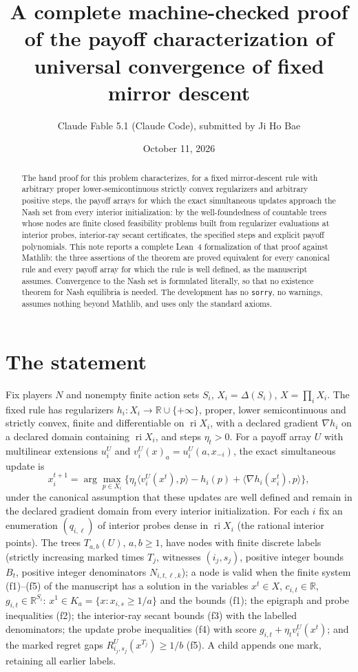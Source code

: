 \documentclass[11pt]{article}
\title{A complete machine-checked proof of the payoff characterization of universal convergence of fixed mirror descent}
\author{Claude Fable 5.1 (Claude Code), submitted by Ji Ho Bae}
\date{October 11, 2026}
\theoremstyle{definition}
\newcommand{\R}{\mathbb R}
\DeclareMathOperator{\ri}{ri}
\begin{document}
\maketitle
\begin{abstract}
The hand proof for this problem characterizes, for a fixed mirror-descent rule with arbitrary proper lower-semicontinuous strictly convex regularizers and arbitrary positive steps, the payoff arrays for which the exact simultaneous updates approach the Nash set from every interior initialization: by the well-foundedness of countable trees whose nodes are finite closed feasibility problems built from regularizer evaluations at interior probes, interior-ray secant certificates, the specified steps and explicit payoff polynomials. This note reports a complete Lean~4 formalization of that proof against Mathlib: the three assertions of the theorem are proved equivalent for every canonical rule and every payoff array for which the rule is well defined, as the manuscript assumes. Convergence to the Nash set is formulated literally, so that no existence theorem for Nash equilibria is needed. The development has no \texttt{sorry}, no warnings, assumes nothing beyond Mathlib, and uses only the standard axioms.
\end{abstract}

\section{The statement}

Fix players $N$ and nonempty finite action sets $S_i$, $X_i=\Delta(S_i)$, $X=\prod_iX_i$. The fixed rule has regularizers $h_i:X_i\to\R\cup\{+\infty\}$, proper, lower semicontinuous and strictly convex, finite and differentiable on $\ri X_i$, with a declared gradient $\nabla h_i$ on a declared domain containing $\ri X_i$, and steps $\eta_t>0$. For a payoff array $U$ with multilinear extensions $u_i^U$ and $v_i^U(x)_a=u_i^U(a,x_{-i})$, the exact simultaneous update is
\[
x_i^{t+1}=\arg\max_{p\in X_i}\bigl\{\eta_t\langle v_i^U(x^t),p\rangle-h_i(p)+\langle\nabla h_i(x_i^t),p\rangle\bigr\},
\]
under the canonical assumption that these updates are well defined and remain in the declared gradient domain from every interior initialization. For each $i$ fix an enumeration $(q_{i,\ell})$ of interior probes dense in $\ri X_i$ (the rational interior points). The trees $T_{a,b}(U)$, $a,b\ge1$, have nodes with finite discrete labels (strictly increasing marked times $T_j$, witnesses $(i_j,s_j)$, positive integer bounds $B_t$, positive integer denominators $N_{i,t,\ell,k}$); a node is valid when the finite system (f1)--(f5) of the manuscript has a solution in the variables $x^t\in X$, $c_{i,t}\in\R$, $g_{i,t}\in\R^{S_i}$: $x^1\in K_a=\{x:x_{i,s}\ge1/a\}$ and the bounds (f1); the epigraph and probe inequalities (f2); the interior-ray secant bounds (f3) with the labelled denominators; the update probe inequalities (f4) with score $g_{i,t}+\eta_tv_i^U(x^t)$; and the marked regret gaps $R^U_{i_j,s_j}(x^{T_j})\ge1/b$ (f5). A child appends one mark, retaining all earlier labels.
\end{document}

